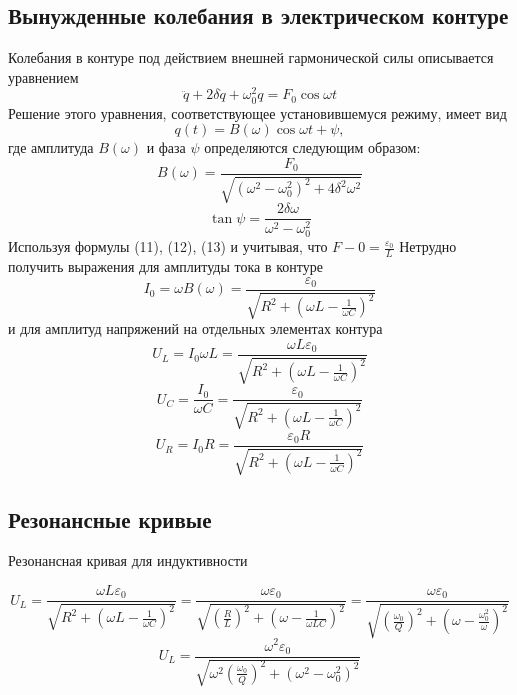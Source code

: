 \subsection{Вынужденные колебания в электрическом контуре} %
Колебания в контуре под действием внешней гармонической силы описывается уравнением
\begin{equation}
	\ddot{q}+2\delta\dot{q}+\omega_0^2 q= F_0\cos{\omega t}
\end{equation}
Решение этого уравнения, соответствующее установившемуся режиму, имеет вид
\begin{equation}
	q(t)=B(\omega)\cos{\omega t+\psi},
\end{equation}
где амплитуда $B(\omega)$ и фаза $\psi$ определяются следующим образом:
\begin{equation}
	B(\omega)=\frac{F_0}{\sqrt{(\omega^2-\omega_0^2)^2+4\delta^2\omega^2}}
\end{equation}
\begin{equation}
	\tan{\psi}=\frac{2\delta\omega}{\omega^2-\omega_0^2}
\end{equation}
	Используя формулы (11), (12), (13) и учитывая, что $F-0=\frac{\varepsilon_0}{L}$
Нетрудно получить выражения для амплитуды тока в контуре
\begin{equation}
	I_0=\omega B(\omega)=\frac{\varepsilon_0}{\sqrt{R^2+(\omega L-\frac{1}{\omega C})^2}}
\end{equation}
и для амплитуд напряжений на отдельных элементах контура
\begin{equation}
	U_L=I_0\omega L=\frac{\omega L\varepsilon_0}{\sqrt{R^2+(\omega L-\frac{1}{\omega C})^2}}
\end{equation}
\begin{equation}
	U_C=\frac{I_0}{\omega C}=\frac{\varepsilon_0}{\sqrt{R^2+(\omega L-\frac{1}{\omega C})^2}}
\end{equation}
\begin{equation}
	U_R=I_0R=\frac{\varepsilon_0R}{\sqrt{R^2+(\omega L-\frac{1}{\omega C})^2}}
\end{equation}

\subsection{Резонансные кривые}
\begin{center}
Резонансная кривая для индуктивности
\end{center}
\begin{equation}
	U_L=\frac{\omega L\varepsilon_0}
			{\sqrt{R^2+(\omega L-\frac{1}{\omega C})^2}}=
		\frac{\omega \varepsilon_0}
			{\sqrt{(\frac{R}{L})^2+(\omega -\frac{1}{\omega LC})^2}}=
		\frac{\omega \varepsilon_0}
			{\sqrt{(\frac{\omega_0}{Q})^2+(\omega -\frac{\omega_0^2}{\omega})^2}}
		\end{equation}
\begin{equation}
	U_L=\frac{\omega^2 \varepsilon_0}{\sqrt{\omega^2(\frac{\omega_0}{Q})^2+(\omega^2 -\omega_0^2)^2}}			
\end{equation}			


